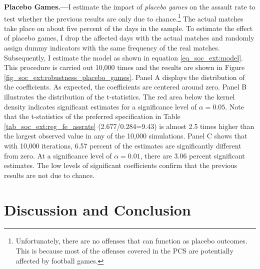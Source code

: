 \textbf{Placebo Games.---}I estimate the impact of \textit{placebo games} on the assault rate to test whether the previous results are only due to chance.\footnote{Unfortunately, there are no offenses that can function as placebo outcomes. This is because most of the offenses covered in the PCS are potentially affected by football games.} The actual matches take place on about five percent of the days in the sample. To estimate the effect of placebo games, I drop the affected days with the actual matches and randomly assign dummy indicators with the same frequency of the real matches. Subsequently, I estimate the model as shown in equation \ref{eq_soc_ext:model}. This procedure is carried out 10,000 times and the results are shown in Figure \ref{fig_soc_ext:robustness_placebo_games}. Panel A displays the distribution of the coefficients. As expected, the coefficients are centered around zero. Panel B illustrates the distribution of the t-statistics. The red area below the kernel density indicates significant estimates for a significance level of $\alpha=0.05$. Note that the t-statistics of the preferred specification in Table \ref{tab_soc_ext:reg_fe_assrate} (2.677/0.284=9.43) is almost 2.5 times higher than the largest observed value in any of the 10,000 simulations. Panel C shows that with 10,000 iterations, 6.57 percent of the estimates are significantly different from zero. At a significance level of $\alpha=0.01$, there are 3.06 percent significant estimates. The low levels of significant coefficients confirm that the previous results are not due to chance. 













\bigskip
\section{Discussion and Conclusion}\label{sec_soc_ext:conclusion}

